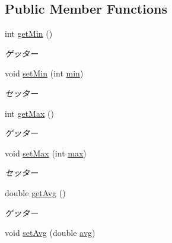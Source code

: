 \subsection*{Public Member Functions}
\begin{DoxyCompactItemize}
\item 
int \hyperlink{classjp_1_1gr_1_1java__conf_1_1yuta__yoshinaga_1_1reversi_1_1model_1_1_reversi_anz_aae8120b93204914c04aae43972b6d621}{get\+Min} ()
\begin{DoxyCompactList}\small\item\em ゲッター \end{DoxyCompactList}\item 
void \hyperlink{classjp_1_1gr_1_1java__conf_1_1yuta__yoshinaga_1_1reversi_1_1model_1_1_reversi_anz_a01e99c7c05a6cca350ea00cc3a0940bf}{set\+Min} (int \hyperlink{classjp_1_1gr_1_1java__conf_1_1yuta__yoshinaga_1_1reversi_1_1model_1_1_reversi_anz_a03c3722077af9aab2f4b021e615ddd72}{min})
\begin{DoxyCompactList}\small\item\em セッター \end{DoxyCompactList}\item 
int \hyperlink{classjp_1_1gr_1_1java__conf_1_1yuta__yoshinaga_1_1reversi_1_1model_1_1_reversi_anz_ae85cd635dc709734737fe32a32e175ac}{get\+Max} ()
\begin{DoxyCompactList}\small\item\em ゲッター \end{DoxyCompactList}\item 
void \hyperlink{classjp_1_1gr_1_1java__conf_1_1yuta__yoshinaga_1_1reversi_1_1model_1_1_reversi_anz_a6afdf8999ea1596591c329c1bf089059}{set\+Max} (int \hyperlink{classjp_1_1gr_1_1java__conf_1_1yuta__yoshinaga_1_1reversi_1_1model_1_1_reversi_anz_ac0a54612de96d94510f2e2245abea839}{max})
\begin{DoxyCompactList}\small\item\em セッター \end{DoxyCompactList}\item 
double \hyperlink{classjp_1_1gr_1_1java__conf_1_1yuta__yoshinaga_1_1reversi_1_1model_1_1_reversi_anz_a4d8aff23231203feaa181be3600dbee2}{get\+Avg} ()
\begin{DoxyCompactList}\small\item\em ゲッター \end{DoxyCompactList}\item 
void \hyperlink{classjp_1_1gr_1_1java__conf_1_1yuta__yoshinaga_1_1reversi_1_1model_1_1_reversi_anz_a951e5d9f08cdfeae668b8cd9adaa38ab}{set\+Avg} (double \hyperlink{classjp_1_1gr_1_1java__conf_1_1yuta__yoshinaga_1_1reversi_1_1model_1_1_reversi_anz_a9dd8cae93b983983c821294b66d03237}{avg})

\end{DoxyCompactItemize}
